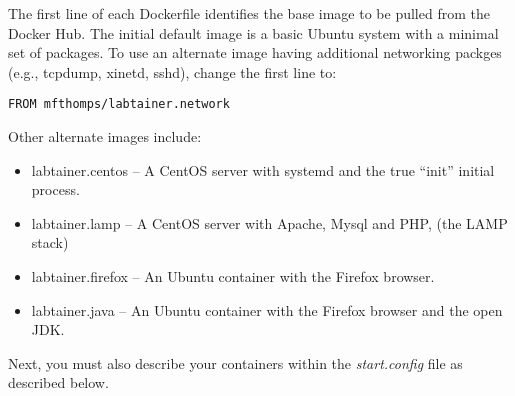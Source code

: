 \documentclass[12pt]{article}
\begin{document}
The first line of each Dockerfile identifies the base image to be pulled from the Docker Hub.
The initial default image is a basic Ubuntu system with a minimal set of packages.  To use an
alternate image having additional networking packges (e.g., tcpdump, xinetd, sshd), change the first line to:
\begin{verbatim}
FROM mfthomps/labtainer.network
\end{verbatim}
\noindent Other alternate images include:
\begin{itemize}
\item labtainer.centos -- A CentOS server with systemd and the true ``init'' initial process.
\item labtainer.lamp -- A CentOS server with Apache, Mysql and PHP, (the LAMP stack)
\item labtainer.firefox -- An Ubuntu container with the Firefox browser.
\item labtainer.java -- An Ubuntu container with the Firefox browser and the open JDK.
\end{itemize}


Next, you must also describe your containers within the \textit{start.config} file as described below.
\end{document}
